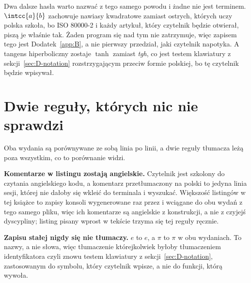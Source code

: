 \medskip
Dwa dalsze hasła warto nazwać z tego samego powodu i żadne nie jest terminem.
$\intcc{a}{b}$ zachowuje nawiasy kwadratowe zamiast ostrych, których uczy
polska szkoła, bo ISO 80000-2 i każdy artykuł, który czytelnik będzie otwierał,
piszą je właśnie tak. Żaden program się nad tym nie zatrzymuje, więc zapisem
tego jest Dodatek~\ref{app:B}, a nie pierwszy przedział, jaki czytelnik
napotyka. A tangens hiperboliczny zostaje $\tanh$ zamiast \emph{tgh}, co jest
testem klawiatury z sekcji~\ref{sec:D-notation} rozstrzygającym przeciw formie
polskiej, bo tę czytelnik będzie wpisywał.

\section{Dwie reguły, których nic nie sprawdzi}
\label{sec:D-untestable}

Oba wydania są porównywane ze sobą linia po linii, a dwie reguły tłumacza leżą
poza wszystkim, co to porównanie widzi.

\textbf{Komentarze w listingu zostają angielskie.} Czytelnik jest szkolony do
czytania angielskiego kodu, a komentarz przetłumaczony na polski to jedyna
linia sesji, której nie dałoby się wkleić do terminala i wyszukać. Większość
listingów w tej książce to zapisy konsoli wygenerowane raz przez 
i wciągane do obu wydań z tego samego pliku, więc ich komentarze są angielskie
z konstrukcji, a nie z czyjejś dyscypliny; listing pisany wprost w tekście
trzyma się tej reguły ręcznie.

\textbf{Zapisu stałej nigdy się nie tłumaczy.} $e$ to $e$, a $\pi$ to $\pi$
w obu wydaniach. To nazwy, a nie słowa, więc tłumaczenie którejkolwiek byłoby
tłumaczeniem identyfikatora \dash{} czyli znowu testem klawiatury z
sekcji~\ref{sec:D-notation}, zastosowanym do symbolu, który czytelnik wpisze,
a nie do funkcji, którą wywoła.
